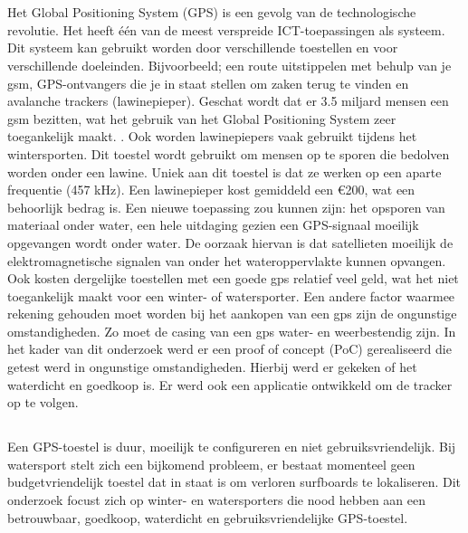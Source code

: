 
\chapter{}
\label{ch:inleiding}
Het Global Positioning System (GPS) is een gevolg van de technologische revolutie. Het heeft één van de meest verspreide ICT-toepassingen als systeem. Dit systeem kan gebruikt worden door verschillende toestellen en voor verschillende doeleinden. Bijvoorbeeld; een route uitstippelen met behulp van je gsm, GPS-ontvangers die je in staat stellen om zaken terug te vinden en avalanche trackers (lawinepieper). Geschat wordt dat er 3.5 miljard mensen een gsm bezitten, wat het gebruik van het Global Positioning System zeer toegankelijk maakt. \autocite{numberOfSmartphones}. Ook worden lawinepiepers vaak gebruikt tijdens het wintersporten. Dit toestel wordt gebruikt om mensen op te sporen die bedolven worden onder een lawine. Uniek aan dit toestel is dat ze werken op een aparte frequentie (457 kHz). Een lawinepieper kost gemiddeld een €200, wat een behoorlijk bedrag is. \cite{avalancheTransceivers}
Een nieuwe toepassing zou kunnen zijn: het opsporen van materiaal onder water, een hele uitdaging gezien een GPS-signaal moeilijk opgevangen wordt onder water. \autocite{underwaterProblem} De oorzaak hiervan is dat satellieten moeilijk de elektromagnetische signalen van onder het wateroppervlakte kunnen opvangen. Ook kosten dergelijke toestellen met een goede gps relatief veel geld, wat het niet toegankelijk maakt voor een winter- of watersporter. 
Een andere factor waarmee rekening gehouden moet worden bij het aankopen van een gps zijn de ongunstige omstandigheden. Zo moet de casing van een gps water- en weerbestendig zijn.
In het kader van dit onderzoek werd er een proof of concept (PoC) gerealiseerd die getest werd in ongunstige omstandigheden. Hierbij werd er gekeken of het waterdicht en goedkoop is. Er werd ook een applicatie ontwikkeld om de tracker op te volgen.


\section{}
\label{sec:probleemstelling}

 Een GPS-toestel is duur, moeilijk te configureren en niet gebruiksvriendelijk. Bij watersport stelt zich een bijkomend probleem, er bestaat momenteel geen budgetvriendelijk toestel dat in staat is om verloren surfboards te lokaliseren. Dit onderzoek focust zich op winter- en watersporters die nood hebben aan een betrouwbaar, goedkoop, waterdicht en gebruiksvriendelijke GPS-toestel.

